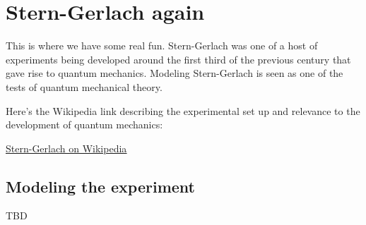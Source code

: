 \section{Stern-Gerlach again}
This is where we have some real fun. Stern-Gerlach was one of a host
of experiments being developed around the first third of the previous
century that gave rise to quantum mechanics. Modeling Stern-Gerlach is
seen as one of the tests of quantum mechanical theory.

Here's the Wikipedia link describing the experimental set up and
relevance to the development of quantum mechanics:

\href{http://en.wikipedia.org/wiki/Stern\%E2\%80\%93Gerlach_experiment}{\underline{Stern-Gerlach on Wikipedia}}

\subsection{Modeling the experiment}

TBD
